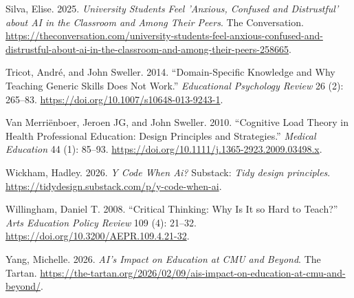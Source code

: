 \documentclass[
]{hdsr}
\newlength{\cslhangindent}
\newenvironment{CSLReferences}[2] %
 {\begin{list}{}{%
  \setlength{\itemindent}{0pt}
  \setlength{\leftmargin}{0pt}
  \setlength{\parsep}{0pt}
  \ifodd #1
   \setlength{\leftmargin}{\cslhangindent}
   \setlength{\itemindent}{-1\cslhangindent}
  \fi
  \setlength{\itemsep}{#2\baselineskip}}}
 {\end{list}}
\begin{document}
\begin{CSLReferences}{1}{1}
Silva, Elise. 2025. \emph{University Students Feel 'Anxious, Confused
and Distrustful' about {AI} in the Classroom and Among Their Peers}. The
Conversation.
\url{https://theconversation.com/university-students-feel-anxious-confused-and-distrustful-about-ai-in-the-classroom-and-among-their-peers-258665}.

Tricot, André, and John Sweller. 2014. {``Domain-Specific Knowledge and
Why Teaching Generic Skills Does Not Work.''} \emph{Educational
Psychology Review} 26 (2): 265--83.
\url{https://doi.org/10.1007/s10648-013-9243-1}.

Van Merriënboer, Jeroen JG, and John Sweller. 2010. {``Cognitive Load
Theory in Health Professional Education: Design Principles and
Strategies.''} \emph{Medical Education} 44 (1): 85--93.
\url{https://doi.org/10.1111/j.1365-2923.2009.03498.x}.

Wickham, Hadley. 2026. \emph{Y Code When Ai?} Substack: \emph{Tidy
design principles}.
\url{https://tidydesign.substack.com/p/y-code-when-ai}.

Willingham, Daniel T. 2008. {``Critical Thinking: Why Is It so Hard to
Teach?''} \emph{Arts Education Policy Review} 109 (4): 21--32.
\url{https://doi.org/10.3200/AEPR.109.4.21-32}.

Yang, Michelle. 2026. \emph{{AI}'s Impact on Education at CMU and
Beyond}. The Tartan.
\url{https://the-tartan.org/2026/02/09/ais-impact-on-education-at-cmu-and-beyond/}.

\end{CSLReferences}
\end{document}
